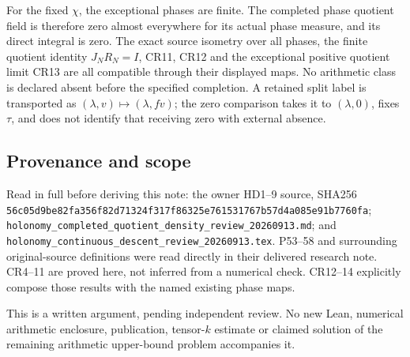 \documentclass{article}
\begin{document}
For the fixed \(\chi\), the exceptional phases are finite. The completed phase quotient field is therefore zero almost everywhere for its actual phase measure, and its direct integral is zero. The exact source isometry over all phases, the finite quotient identity \(J_NR_N=I\), CR11, CR12 and the exceptional positive quotient limit CR13 are all compatible through their displayed maps. No arithmetic class is declared absent before the specified completion. A retained split label is transported as \((\lambda,v)\mapsto(\lambda,fv)\); the zero comparison takes it to \((\lambda,0)\), fixes \(\tau\), and does not identify that receiving zero with external absence.

\subsection{Provenance and scope}\label{provenance-and-scope}

\begingroup\raggedright
Read in full before deriving this note: the owner HD1--9 source, SHA256 \nolinkurl{56c05d9be82fa356f82d71324f317f86325e761531767b57d4a085e91b7760fa}; \nolinkurl{holonomy_completed_quotient_density_review_20260913.md}; and \nolinkurl{holonomy_continuous_descent_review_20260913.tex}. P53--58 and surrounding original-source definitions were read directly in their delivered research note. CR4--11 are proved here, not inferred from a numerical check. CR12--14 explicitly compose those results with the named existing phase maps.

\par\endgroup

This is a written argument, pending independent review. No new Lean, numerical arithmetic enclosure, publication, tensor-\(k\) estimate or claimed solution of the remaining arithmetic upper-bound problem accompanies it.
\end{document}
